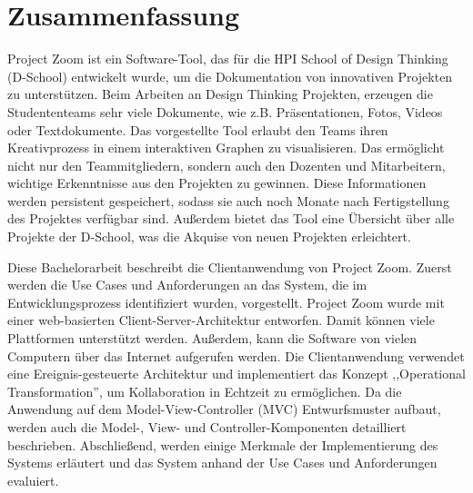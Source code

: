 \chapter*{Zusammenfassung}
\hypertarget{abstract_de}{}

Project Zoom ist ein Software-Tool, das für die HPI School of Design Thinking (D-School) entwickelt wurde, um die Dokumentation von innovativen Projekten zu unterstützen. Beim Arbeiten an Design Thinking Projekten, erzeugen die Studententeams sehr viele Dokumente, wie z.B. Präsentationen, Fotos, Videos oder Textdokumente. Das vorgestellte Tool erlaubt den Teams ihren Kreativprozess in einem interaktiven Graphen zu visualisieren. Das ermöglicht nicht nur den Teammitgliedern, sondern auch den Dozenten und Mitarbeitern, wichtige Erkenntnisse aus den Projekten zu gewinnen. Diese Informationen werden persistent gespeichert, sodass sie auch noch Monate nach Fertigstellung des Projektes verfügbar sind. Außerdem bietet das Tool eine Übersicht über alle Projekte der D-School, was die Akquise von neuen Projekten erleichtert.

Diese Bachelorarbeit beschreibt die Clientanwendung von Project Zoom. Zuerst werden die Use Cases und Anforderungen an das System, die im Entwicklungsprozess identifiziert wurden, vor\-ge\-stellt. Project Zoom wurde mit einer web-basierten Client-Server-Architektur entworfen. Damit können viele Plattformen unterstützt werden. Außerdem, kann die Software von vielen Computern über das Internet aufgerufen werden. Die Clientanwendung verwendet eine Ereignis-gesteuerte Architektur und implementiert das Konzept ,,Operational Transformation'', um Kollaboration in Echtzeit zu er\-mö\-glich\-en. Da die Anwendung auf dem Model-View-Controller (MVC) Entwurfsmuster aufbaut, werden auch die Model-, View- und Controller-Komponenten detailliert be\-schrie\-ben. Abschließend, werden einige Merkmale der Implementierung des Systems erläutert und das System anhand der Use Cases und Anforderungen evaluiert.